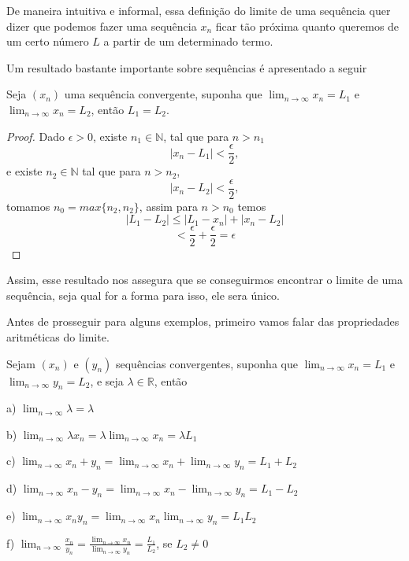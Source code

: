 De maneira intuitiva e informal, essa definição do limite de uma sequência quer
dizer que podemos fazer uma sequência $x_n$ ficar tão próxima quanto queremos de
um certo número $L$ a partir de um determinado termo.

Um resultado bastante importante sobre sequências é apresentado a seguir

\begin{teo}\label{teo:Unicidade do limite} Seja $(x_n)$ uma
    sequência convergente, suponha que $\lim_{n \to \infty} x_n = L_1$ e 
    $\lim_{n \to \infty} x_n = L_2$, então $L_1 = L_2$.
\end{teo}

\begin{proof}
    Dado $\epsilon > 0$, existe $n_1 \in \mathbb{N}$, tal que para $n>n_1$
    $$|x_n - L_1| < \frac{\epsilon}{2},$$
    e existe $n_2 \in \mathbb{N}$ tal que para $n>n_2$, 
    $$|x_n - L_2| < \frac{\epsilon}{2},$$
    tomamos $n_0 = max\{n_2,n_2\}$, assim para $n > n_0$ temos
    $$|L_1-L_2| \leq |L_1 - x_n| + |x_n - L_2|$$
    $$ < \frac{\epsilon}{2} + \frac{\epsilon}{2} = \epsilon$$
\end{proof}

Assim, esse resultado nos assegura que se conseguirmos encontrar o limite de uma
sequência, seja qual for a forma para isso, ele sera único.

Antes de prosseguir para alguns exemplos, primeiro vamos falar das propriedades 
aritméticas do limite.

\begin{teo}\label{teo:Propriedades} Sejam $(x_n)$ e $(y_n)$
    sequências convergentes, suponha que $\lim_{n \to \infty} x_n = L_1$ e
    $\lim_{n \to \infty} y_n = L_2$, e seja $\lambda \in \mathbb{R}$, então
    \item  [a)] $\lim_{n \to \infty} \lambda = \lambda$
    \item  [b)] $\lim_{n \to \infty}\lambda x_n = \lambda \lim_{n \to \infty} x_n = \lambda L_1$
    \item  [c)] $\lim_{n \to \infty} x_n + y_n = \lim_{n \to \infty} x_n + \lim_{n \to \infty} y_n = L_1 + L_2$
    \item  [d)] $\lim_{n \to \infty} x_n - y_n = \lim_{n \to \infty} x_n - \lim_{n \to \infty} y_n = L_1 - L_2$
    \item  [e)] $\lim_{n \to \infty} x_n y_n = \lim_{n \to \infty} x_n \lim_{n \to \infty} y_n = L_1 L_2$
    \item  [f)] $\lim_{n \to \infty} \frac{x_n}{y_n} = \frac{\lim_{n \to \infty} x_n}{\lim_{n \to \infty} y_n} 
    = \frac{L_1}{L_2}$, se $L_2 \neq 0$
\end{teo}

